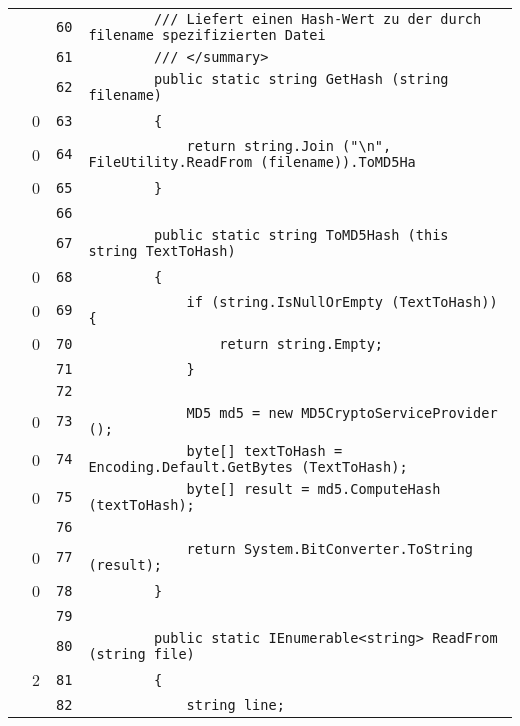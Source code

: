 \documentclass[a4paper,10pt]{article}
\begin{document}
\begin{longtable}[l]{lrrl}
\cellcolor{gray} &  & \verb~60~ & \verb~        /// Liefert einen Hash-Wert zu der durch filename spezifizierten Datei~\\
\cellcolor{gray} &  & \verb~61~ & \verb~        /// </summary>~\\
\cellcolor{gray} &  & \verb~62~ & \verb~        public static string GetHash (string filename)~\\
\cellcolor{red} & 0 & \verb~63~ & \verb~        {~\\
\cellcolor{red} & 0 & \verb~64~ & \verb~            return string.Join ("\n", FileUtility.ReadFrom (filename)).ToMD5Ha~\\
\cellcolor{red} & 0 & \verb~65~ & \verb~        }~\\
\cellcolor{gray} &  & \verb~66~ & \verb~~\\
\cellcolor{gray} &  & \verb~67~ & \verb~        public static string ToMD5Hash (this string TextToHash)~\\
\cellcolor{red} & 0 & \verb~68~ & \verb~        {~\\
\cellcolor{red} & 0 & \verb~69~ & \verb~            if (string.IsNullOrEmpty (TextToHash)) {~\\
\cellcolor{red} & 0 & \verb~70~ & \verb~                return string.Empty;~\\
\cellcolor{gray} &  & \verb~71~ & \verb~            }~\\
\cellcolor{gray} &  & \verb~72~ & \verb~~\\
\cellcolor{red} & 0 & \verb~73~ & \verb~            MD5 md5 = new MD5CryptoServiceProvider ();~\\
\cellcolor{red} & 0 & \verb~74~ & \verb~            byte[] textToHash = Encoding.Default.GetBytes (TextToHash);~\\
\cellcolor{red} & 0 & \verb~75~ & \verb~            byte[] result = md5.ComputeHash (textToHash);~\\
\cellcolor{gray} &  & \verb~76~ & \verb~~\\
\cellcolor{red} & 0 & \verb~77~ & \verb~            return System.BitConverter.ToString (result);~\\
\cellcolor{red} & 0 & \verb~78~ & \verb~        }~\\
\cellcolor{gray} &  & \verb~79~ & \verb~~\\
\cellcolor{gray} &  & \verb~80~ & \verb~        public static IEnumerable<string> ReadFrom (string file)~\\
\cellcolor{green} & 2 & \verb~81~ & \verb~        {~\\
\cellcolor{gray} &  & \verb~82~ & \verb~            string line;~\\

\end{longtable}
\end{document}
